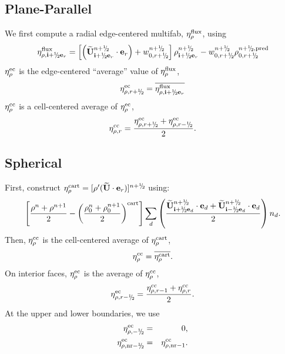 \subsection{Plane-Parallel}
We first compute a radial edge-centered multifab, $\eta_{\rho}^{\rm flux}$, using
\begin{equation}
\eta_{\rho,\ib+\myhalf\eb_r}^{\rm flux} = \left[\left(\Ubt_{\ib+\myhalf\eb_r}^{n+\myhalf}\cdot\eb_r\right) + w_{0,r+\myhalf}^{n+\myhalf}\right] \rho_{\ib+\myhalf\eb_r}^{n+\myhalf} - w_{0,r+\myhalf}^{n+\myhalf}\rho_{0,r+\myhalf}^{n+\myhalf, {\rm pred}}
\end{equation}
$\eta_{\rho}^{\rm ec}$ is the edge-centered ``average'' value of $\eta_{\rho}^{\rm flux}$,
\begin{equation}
\eta_{\rho,r+\myhalf}^{\rm ec} = \overline{\eta_{\rho,\ib+\myhalf\eb_r}^{\rm flux}}
\end{equation}
$\eta_{\rho}^{\rm cc}$ is a cell-centered average of $\eta_{\rho}^{\rm ec}$,
\begin{equation}
\eta_{\rho,r}^{\rm cc} = \frac{\eta_{\rho,r+\myhalf}^{\rm ec} + \eta_{\rho,r-\myhalf}^{\rm ec}}{2}.
\end{equation}

\subsection{Spherical}\label{Sec:eta Spherical}
First, construct $\eta_{\rho}^{\rm cart} =
[\rho'(\Ubt\cdot\eb_r)]^{n+\myhalf}$ using:
\begin{equation}
\left[\frac{\rho^n+\rho^{n+1}}{2}-\left(\frac{\rho_0^n+\rho_0^{n+1}}{2}\right)^{\rm cart}\right] \sum_d\left(\frac{\Ubt_{\ib+\myhalf\eb_d}^{n+\myhalf}\cdot\eb_d+\Ubt_{\ib-\myhalf\eb_d}^{n+\myhalf}\cdot\eb_d}{2}\right)n_d.
\end{equation}
Then, $\eta_{\rho}^{\rm cc}$ is the cell-centered average of $\eta_{\rho}^{\rm cart}$,
\begin{equation}
\eta_{\rho}^{\rm cc} = \overline{\eta_{\rho}^{\rm cart}}.
\end{equation}
On interior faces, $\eta_{\rho}^{\rm ec}$ is the average of $\eta_{\rho}^{\rm cc}$,
\begin{equation}
\eta_{\rho,r-\myhalf}^{\rm ec} = \frac{\eta_{\rho,r-1}^{\rm cc} + \eta_{\rho,r}^{\rm cc}}{2}.
\end{equation}
At the upper and lower boundaries, we use
\begin{eqnarray}
\eta_{\rho,-\myhalf}^{\rm ec} &=& 0, \\
\eta_{\rho,{\rm nr}-\myhalf}^{\rm ec} &=& \eta_{\rho,{\rm nr}-1}^{\rm cc}.
\end{eqnarray}

